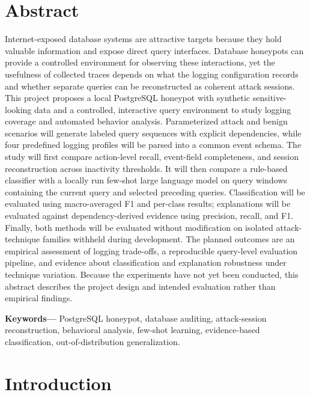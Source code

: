 \documentclass[12pt,a4paper]{report}
\begin{document}
\chapter*{Abstract}
Internet-exposed database systems are attractive targets because they hold valuable information and expose direct query interfaces. Database honeypots can provide a controlled environment for observing these interactions, yet the usefulness of collected traces depends on what the logging configuration records and whether separate queries can be reconstructed as coherent attack sessions. This project proposes a local PostgreSQL honeypot with synthetic sensitive-looking data and a controlled, interactive query environment to study logging coverage and automated behavior analysis. Parameterized attack and benign scenarios will generate labeled query sequences with explicit dependencies, while four predefined logging profiles will be parsed into a common event schema. The study will first compare action-level recall, event-field completeness, and session reconstruction across inactivity thresholds. It will then compare a rule-based classifier with a locally run few-shot large language model on query windows containing the current query and selected preceding queries. Classification will be evaluated using macro-averaged F1 and per-class results; explanations will be evaluated against dependency-derived evidence using precision, recall, and F1. Finally, both methods will be evaluated without modification on isolated attack-technique families withheld during development. The planned outcomes are an empirical assessment of logging trade-offs, a reproducible query-level evaluation pipeline, and evidence about classification and explanation robustness under technique variation. Because the experiments have not yet been conducted, this abstract describes the project design and intended evaluation rather than empirical findings.

\noindent\textbf{Keywords---} PostgreSQL honeypot, database auditing, attack-session reconstruction, behavioral analysis, few-shot learning, evidence-based classification, out-of-distribution generalization.

\tableofcontents
\clearpage
{}

\chapter{Introduction}
\end{document}

